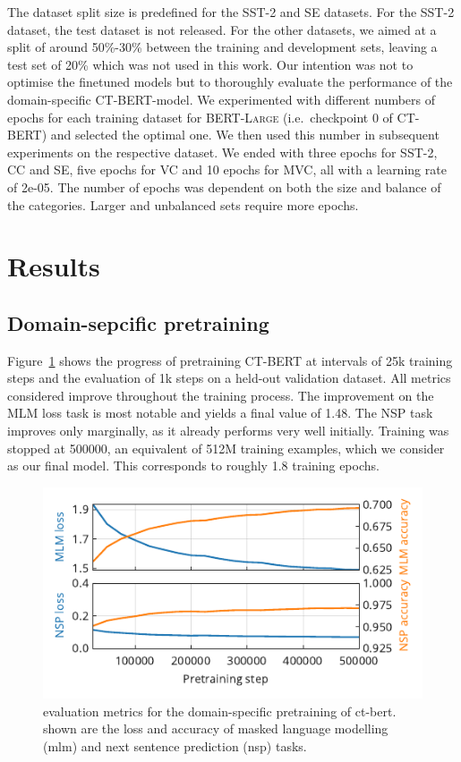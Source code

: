 \documentclass{article}
\begin{document}
The dataset split size is predefined for the SST-2 and SE datasets.
For the SST-2 dataset, the test dataset is not released.
For the other datasets, we aimed at a split of around 50\%-30\% between the training and development sets, leaving a test set of 20\% which was not used in this work.
Our intention was not to optimise the finetuned models but to thoroughly evaluate the performance of the domain-specific \textsc{CT-BERT}-model.
We experimented with different numbers of epochs for each training dataset for \textsc{BERT-Large} (i.e.\ checkpoint 0 of \textsc{CT-BERT}) and selected the optimal one.
We then used this number in subsequent experiments on the respective dataset.
We ended with three epochs for SST-2, CC and SE, five epochs for VC and 10 epochs for MVC, all with a learning rate of 2e-05.
The number of epochs was dependent on both the size and balance of the categories.
Larger and unbalanced sets require more epochs.

\section{Results}
\label{sec:results}

\subsection{Domain-sepcific pretraining}
\label{sec:domain_specific_pretraining}
Figure~\ref{fig:fig1} shows the progress of pretraining \textsc{CT-BERT} at intervals of 25k training steps and the evaluation of 1k steps on a held-out validation dataset.
All metrics considered improve throughout the training process.
The improvement on the MLM loss task is most notable and yields a final value of 1.48.
The NSP task improves only marginally, as it already performs very well initially.
Training was stopped at \num{500000}, an equivalent of \num{512}M training examples, which we consider as our final model.
This corresponds to roughly 1.8 training epochs.

\begin{figure}[h!]
  \centering
  \includegraphics[]{figures/fig1.pdf}
  \caption{
    evaluation metrics for the domain-specific pretraining of ct-bert.
    shown are the loss and accuracy of masked language modelling (mlm) and next sentence prediction (nsp) tasks.
  }
  \label{fig:fig1}
\end{figure}
\end{document}
